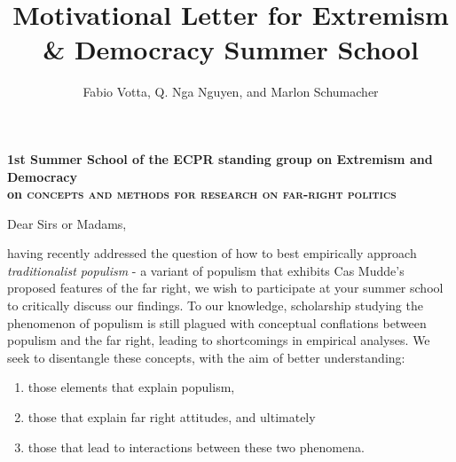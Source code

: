 \documentclass[10pt]{article}
\begin{document}
\title{Motivational Letter for Extremism \& Democracy Summer School}

\author{Fabio Votta, Q. Nga Nguyen, and Marlon Schumacher}

\address{B.A. University of Stuttgart, Department for Empirical Social Research, \href{fabio.votta@gmail.com}{fabio.votta@gmail.com}\\
B.A. Institut d'Etudes Politiques de Bordeaux/ University of Stuttgart,\\ Department of Political Theory and Empirical Democracy Research,  \href{nga.nguyen@scpobx.fr}{nga.nguyen@scpobx.fr}\\
B.A. University of Stuttgart, Frauenhofer Society, 
\href{M.C.Schumacher@live.de}{m.c.schumacher@live.de}}





\vspace{0.4cm}
\begin{center}
\noindent \textbf{\large 1st Summer School of the ECPR standing group on Extremism and Democracy \\on \textsc{concepts and methods for research on far-right politics}}
\end{center}
\vspace{0.2cm}

\noindent Dear Sirs or Madams,

\vspace{0.3cm}

having recently addressed the question of how to best empirically approach \textit{traditionalist populism} - a variant of populism that exhibits Cas Mudde's proposed features of the far right, we wish to participate at your summer school to critically discuss our findings. To our knowledge, scholarship studying the phenomenon of populism is still plagued with conceptual conflations between populism and the far right, leading to shortcomings in empirical analyses. We seek to disentangle these concepts, with the aim of better understanding:
\begin{enumerate}
\item those elements that explain populism, 
\item those that explain far right attitudes, and ultimately
\item those that lead to interactions between these two phenomena.
\end{enumerate}
\end{document}
